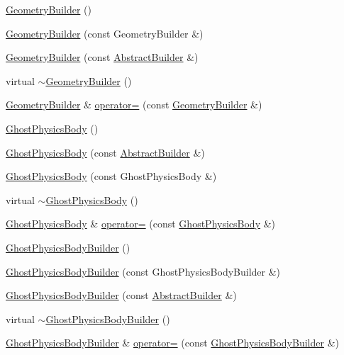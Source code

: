\begin{DoxyCompactItemize}
\item 
\hyperlink{namespacejli_a0e63e2a5bcaa55a7526257c8e6a91531}{Geometry\+Builder} ()
\item 
\hyperlink{namespacejli_a3d074d26030ba005edd7dc2d2ecf5e55}{Geometry\+Builder} (const Geometry\+Builder \&)
\item 
\hyperlink{namespacejli_a004bdd1f9192de71fa05cffd2893f2f4}{Geometry\+Builder} (const \hyperlink{classjli_1_1_abstract_builder}{Abstract\+Builder} \&)
\item 
virtual \hyperlink{namespacejli_aa459cb842ce78ca87f46e048d1f0181b}{$\sim$\+Geometry\+Builder} ()
\item 
\hyperlink{namespacejli_a0e63e2a5bcaa55a7526257c8e6a91531}{Geometry\+Builder} \& \hyperlink{namespacejli_a73c17d348157cd5a98476f9bb232ffb3}{operator=} (const \hyperlink{namespacejli_a0e63e2a5bcaa55a7526257c8e6a91531}{Geometry\+Builder} \&)
\item 
\hyperlink{namespacejli_a7caf1415906897121ee3e6de60a329c8}{Ghost\+Physics\+Body} ()
\item 
\hyperlink{namespacejli_afb5a03f7022ad75046c07614859007b4}{Ghost\+Physics\+Body} (const \hyperlink{classjli_1_1_abstract_builder}{Abstract\+Builder} \&)
\item 
\hyperlink{namespacejli_ad74fccf745d72bb59ea02ffcf00325ba}{Ghost\+Physics\+Body} (const Ghost\+Physics\+Body \&)
\item 
virtual \hyperlink{namespacejli_abfb169533b2b5c29c2006d9db4a7f886}{$\sim$\+Ghost\+Physics\+Body} ()
\item 
\hyperlink{namespacejli_a7caf1415906897121ee3e6de60a329c8}{Ghost\+Physics\+Body} \& \hyperlink{namespacejli_ad382a206eb3ee58d6d77638319d16a92}{operator=} (const \hyperlink{namespacejli_a7caf1415906897121ee3e6de60a329c8}{Ghost\+Physics\+Body} \&)
\item 
\hyperlink{namespacejli_a3aff4e56b78db8f38ca21c4215ef5c05}{Ghost\+Physics\+Body\+Builder} ()
\item 
\hyperlink{namespacejli_ac715c051dda98c145182dfd6797b21d4}{Ghost\+Physics\+Body\+Builder} (const Ghost\+Physics\+Body\+Builder \&)
\item 
\hyperlink{namespacejli_a87d58ccea384f9c099a54185ac2b10e1}{Ghost\+Physics\+Body\+Builder} (const \hyperlink{classjli_1_1_abstract_builder}{Abstract\+Builder} \&)
\item 
virtual \hyperlink{namespacejli_a7dd6a4d9cc536d96cbb275a6bdc103c7}{$\sim$\+Ghost\+Physics\+Body\+Builder} ()
\item 
\hyperlink{namespacejli_a3aff4e56b78db8f38ca21c4215ef5c05}{Ghost\+Physics\+Body\+Builder} \& \hyperlink{namespacejli_a00a7b4875cc46a0309f9372b44b119b1}{operator=} (const \hyperlink{namespacejli_a3aff4e56b78db8f38ca21c4215ef5c05}{Ghost\+Physics\+Body\+Builder} \&)

\end{DoxyCompactItemize}
